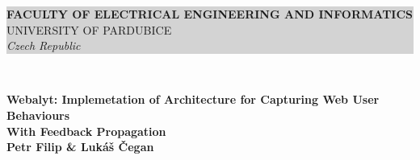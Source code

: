 \documentclass[landscape]{a0poster}
\begin{document}



\hspace{-7ex}
\noindent\colorbox{lightgray} {
\hspace{+5ex}
\begin{minipage}[b]{0.75\linewidth}
\vspace{+7ex}
\veryHuge \color{MainColor} \textbf{FACULTY OF ELECTRICAL ENGINEERING
AND INFORMATICS} \color{Black}\\ %
\color{gray} \Huge{UNIVERSITY OF PARDUBICE}\\ %
\huge \textit{Czech Republic}\\ %

\end{minipage}
%
\begin{minipage}[b]{0.35\linewidth}
\vspace{+5ex}
\unilogoPoster
\vspace{+0ex}
\end{minipage}
}\\[1cm]




\begin{minipage}[b]{\linewidth}
\begin{center}
\veryHuge \color{MainColor} \textbf{Webalyt: Implemetation of Architecture for Capturing Web User Behaviours\\ With Feedback Propagation} \color{Black}
\\[1cm]
\color{gray}
\huge \textbf{Petr Filip \& Lukáš Čegan}\\ %
\end{center}
\end{minipage}

%

\vspace{1cm} %

\end{document}
